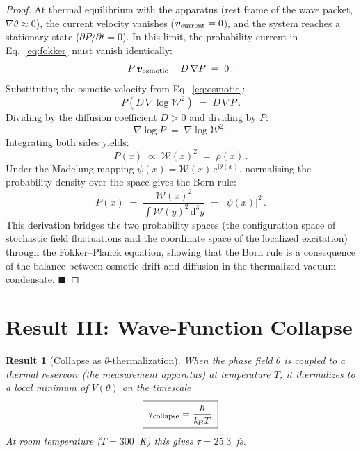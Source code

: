 \documentclass[12pt,a4paper]{article}
\theoremstyle{plain}
\newtheorem{result}{Result}
\theoremstyle{definition}
\theoremstyle{remark}
\newcommand{\hb}{\hbar}
\newcommand{\kB}{k_{\!B}}
\newcommand{\Wc}{\mathcal{W}}
\newcommand{\dd}{\mathrm{d}}
\newcommand{\ee}{\mathrm{e}}
\newcommand{\ii}{\mathrm{i}}
\newcommand{\QED}{\hfill$\blacksquare$}
\begin{document}
\begin{proof}
At thermal equilibrium with the apparatus (rest frame of the wave packet, $\nabla\theta \approx 0$), the current velocity vanishes ($\bm{v}_{\rm current} = 0$), and the system reaches a stationary state ($\partial P/\partial t = 0$). In this limit, the probability current in Eq.~\eqref{eq:fokker} must vanish identically:
\begin{equation}\label{eq:balance}
  P\,\bm{v}_{\rm osmotic} - D\,\nabla P \;=\; 0\,.
\end{equation}
Substituting the osmotic velocity from Eq.~\eqref{eq:osmotic}:
\begin{equation}
  P \left( D\,\nabla\log\Wc^2 \right) \;=\; D\,\nabla P\,.
\end{equation}
Dividing by the diffusion coefficient $D > 0$ and dividing by $P$:
\begin{equation}
  \nabla\log P \;=\; \nabla\log\Wc^2\,.
\end{equation}
Integrating both sides yields:
\begin{equation}
  P(x) \;\propto\; \Wc(x)^2 \;=\; \rho(x)\,.
\end{equation}
Under the Madelung mapping $\psi(x) = \Wc(x)\,\ee^{\ii\theta(x)}$, normalising the probability density over the space gives the Born rule:
\begin{equation}
  P(x) \;=\; \frac{\Wc(x)^2}{\int \Wc(y)^2\,\dd^3y} \;=\; |\psi(x)|^2\,.
\end{equation}
This derivation bridges the two probability spaces (the configuration space of stochastic field fluctuations and the coordinate space of the localized excitation) through the Fokker--Planck equation, showing that the Born rule is a consequence of the balance between osmotic drift and diffusion in the thermalized vacuum condensate.
\QED
\end{proof}


\section{Result III: Wave-Function Collapse}\label{sec:III}

\begin{result}[Collapse as $\theta$-thermalization]
\label{thm:collapse}
When the phase field $\theta$ is coupled to a thermal reservoir
(the measurement apparatus) at temperature $T$, it thermalizes
to a local minimum of $V(\theta)$ on the timescale
\begin{equation}\label{eq:tau}
  \boxed{\;\tau_{\rm collapse}
  = \frac{\hb}{\kB T}\;}
\end{equation}
At room temperature ($T = 300$~K) this gives
$\tau = 25.3$~fs.
\end{result}
\end{document}
